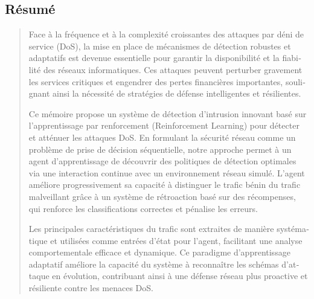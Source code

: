 \documentclass[12pt]{report}
\begin{document}
\newpage
\begin{otherlanguage}{french}
\chapter*{Résumé}

\begin{quote}
\large
Face à la fréquence et à la complexité croissantes des attaques par déni de service (DoS), la mise en place de mécanismes de détection robustes et adaptatifs est devenue essentielle pour garantir la disponibilité et la fiabilité des réseaux informatiques. Ces attaques peuvent perturber gravement les services critiques et engendrer des pertes financières importantes, soulignant ainsi la nécessité de stratégies de défense intelligentes et résilientes.

Ce mémoire propose un système de détection d’intrusion innovant basé sur l’apprentissage par renforcement (Reinforcement Learning) pour détecter et atténuer les attaques DoS. En formulant la sécurité réseau comme un problème de prise de décision séquentielle, notre approche permet à un agent d’apprentissage de découvrir des politiques de détection optimales via une interaction continue avec un environnement réseau simulé. L’agent améliore progressivement sa capacité à distinguer le trafic bénin du trafic malveillant grâce à un système de rétroaction basé sur des récompenses, qui renforce les classifications correctes et pénalise les erreurs.

Les principales caractéristiques du trafic sont extraites de manière systématique et utilisées comme entrées d’état pour l’agent, facilitant une analyse comportementale efficace et dynamique. Ce paradigme d’apprentissage adaptatif améliore la capacité du système à reconnaître les schémas d’attaque en évolution, contribuant ainsi à une défense réseau plus proactive et résiliente contre les menaces DoS.
\end{quote}

\vspace{1em}
\end{otherlanguage}


\tableofcontents
\newpage
\end{document}
